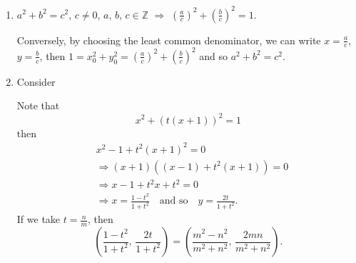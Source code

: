 \begin{remark}
    \begin{enumerate}
        \item $a^2+b^2=c^2$, $c \neq 0$, $a,\,b,\,c\in\mathbb{Z}$
        $\Rightarrow$ $\left(\frac{a}{c}\right)^2+\left(\frac{b}{c}\right)^2=1$.

        Conversely, by choosing the least common denominator, we can write $x=\frac{a}{c}$, $y=\frac{b}{c}$,
        then $1=x_0^2+y_0^2=\left(\frac{a}{c}\right)^2+\left(\frac{b}{c}\right)^2$ and so $a^2+b^2=c^2$.
        \item Consider
        \begin{center}
        \end{center}
        Note that
        \[
            x^2+\left(t\left(x+1\right)\right)^2=1
        \]
        then
        \begin{align*}
            & x^2-1+t^2\left(x+1\right)^2=0 \\
            &\Rightarrow \left(x+1\right)\left(\left(x-1\right)+t^2\left(x+1\right)\right)=0 \\
            &\Rightarrow x-1+t^2x+t^2=0 \\
            &\Rightarrow x=\frac{1-t^2}{1+t^2} \quad \mbox{and so} \quad y=\frac{2t}{1+t^2}.
        \end{align*}
        If we take $t=\frac{n}{m}$, then 
        \[
            \left( \frac{1-t^2}{1+t^2},\,\frac{2t}{1+t^2} \right) = \left( \frac{m^2-n^2}{m^2+n^2},\,\frac{2mn}{m^2+n^2} \right).
        \]
    \end{enumerate}
\end{remark}

